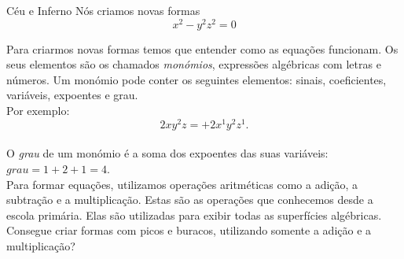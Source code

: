 \begin{surferPage}{Céu e Inferno}
N\'os criamos novas formas \\
\smallskip
\[x^2	- y^2z^2	= 0\]

\singlespacing
Para criarmos novas formas temos que entender como as equa\c c\~oes funcionam. Os seus elementos s\~ao os chamados  {\it mon\'omios}, express\~oes alg\'ebricas com letras e n\'umeros.
\singlespacing
Um mon\'omio pode conter os seguintes elementos:
sinais, coeficientes, vari\'aveis, expoentes e grau.\\
\singlespacing
Por exemplo: 
\smallskip
\[2xy^2z = +2x^1y^2z^1.\]
\\
\smallskip
O  {\it grau} de um mon\'omio \'e a soma dos expoentes das suas vari\'aveis: $grau = 1+2+1=4$.  \\
\singlespacing
Para formar equa\c c\~oes, utilizamos opera\c c\~oes aritm\'eticas como a adi\c c\~ao, a subtra\c c\~ao e a multiplica\c c\~ao. Estas s\~ao as opera\c c\~oes que conhecemos desde a escola prim\'aria. Elas s\~ao utilizadas para exibir todas as superf\'icies alg\'ebricas.
\singlespacing
Consegue criar formas com picos e buracos, utilizando somente a adi\c c\~ao e a multiplica\c c\~ao?
\end{surferPage}

